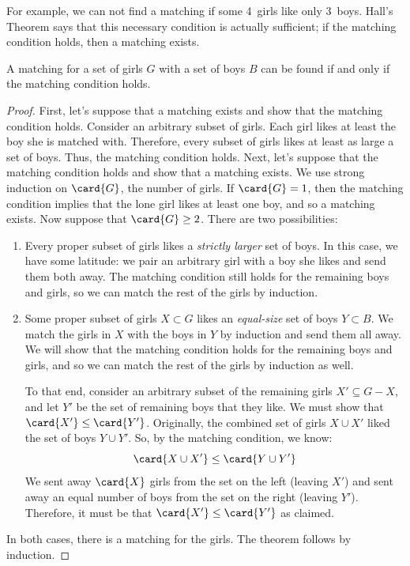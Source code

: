 For example, we can not find a matching if some 4~girls like only 3~boys.
Hall's Theorem says that this necessary condition is actually sufficient;
if the matching condition holds, then a matching exists.

\begin{theorem}
A matching for a set of girls $G$ with a set of boys $B$ can be found if
and only if the matching condition holds.
\end{theorem}

\begin{proof}
First, let's suppose that a matching exists and show that the matching
condition holds.  Consider an arbitrary subset of girls.  Each girl likes
at least the boy she is matched with.  Therefore, every subset of girls
likes at least as large a set of boys.  Thus, the matching condition
holds.
Next, let's suppose that the matching condition holds and show that a
matching exists.  We use strong induction on $\card{G}$, the number of
girls.  If $\card{G} = 1$, then the matching condition implies that the
lone girl likes at least one boy, and so a matching exists.  Now suppose
that $\card{G} \geq 2$.  There are two possibilities:

\begin{enumerate}
\item Every proper subset of girls likes a \emph{strictly larger} set of
  boys.  In this case, we have some latitude: we pair an arbitrary girl
  with a boy she likes and send them both away.  The matching condition
  still holds for the remaining boys and girls, so we can match the rest
  of the girls by induction.

\item Some proper subset of girls $X \subset G$ likes an \emph{equal-size}
  set of boys $Y \subset B$.  We match the girls in $X$ with the boys in
  $Y$ by induction and send them all away.  We will show that the matching
  condition holds for the remaining boys and girls, and so we can match
  the rest of the girls by induction as well.

To that end, consider an arbitrary subset of the remaining girls $X'
\subseteq G - X$, and let $Y'$ be the set of remaining boys that they
like.  We must show that $\card{X'} \leq \card{Y'}$.  Originally, the
combined set of girls $X \cup X'$ liked the set of boys $Y \cup Y'$.
So, by the matching condition, we know:
%
\[
\card{X \cup X'}  \leq  \card{Y \cup Y'}
\]
%
We sent away $\card{X}$ girls from the set on the left (leaving $X'$)
and sent away an equal number of boys from the set on the right
(leaving $Y'$).  Therefore, it must be that $\card{X'}
\leq \card{Y'}$ as claimed.
\end{enumerate}
In both cases, there is a matching for the girls.  The theorem follows
by induction.
\end{proof}

